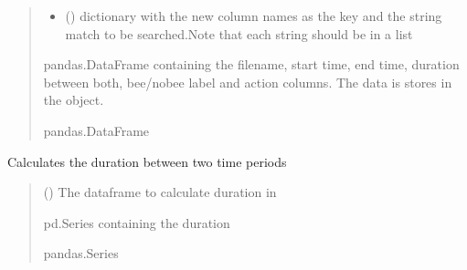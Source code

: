 \documentclass[letterpaper,10pt,english]{sphinxmanual}
\begin{document}
\begin{fulllineitems}
\begin{fulllineitems}
\begin{quote}
\begin{description}
\begin{itemize}
\item {} 
\sphinxAtStartPar
{} () \textendash{} dictionary with the new column names as the key and the string match to be searched.Note that each string should be in a list

\end{itemize}

\sphinxAtStartPar
pandas.DataFrame containing the filename, start time, end time, duration between both, bee/nobee label and action columns. The data is stores in the object.

\sphinxAtStartPar
pandas.DataFrame

\end{description}\end{quote}

\end{fulllineitems}


\begin{fulllineitems}
\label{\detokenize{BeeData:BeeData.BeeData.calc_duration}}
\pysigstartsignatures
{}
\pysigstopsignatures
\sphinxAtStartPar
Calculates the duration between two time periods
\begin{quote}\begin{description}
\sphinxAtStartPar
{} () \textendash{} The dataframe to calculate duration in

\sphinxAtStartPar
pd.Series containing the duration

\sphinxAtStartPar
pandas.Series

\end{description}\end{quote}

\end{fulllineitems}



\end{fulllineitems}
\end{document}
